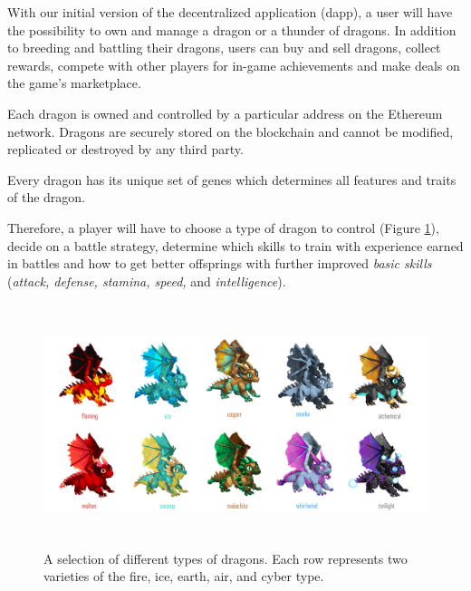 \documentclass[12pt]{article}
\begin{document}
With our initial version of the decentralized application (dapp), a user will have the possibility to own and manage a dragon or a thunder of dragons. In addition to breeding and battling their dragons, users can buy and sell dragons, collect rewards, compete with other players for in-game achievements and make deals on the game’s marketplace.\par

Each dragon is owned and controlled by a particular address on the Ethereum network. Dragons are securely stored on the blockchain and cannot be modified, replicated or destroyed by any third party.\par

Every dragon has its unique set of genes which determines all features and traits of the dragon.\par

Therefore, a player will have to choose a type of dragon to control (Figure \ref{fig:A_selection_of_different_types_of_dragons__Each_row_represents_two_varieties_of_the_fire_ice_earth_air_and_cyber_type_}), decide on a battle strategy, determine which skills to train with experience earned in battles and how to get better offsprings with further improved \textit{basic skills} (\textit{attack, defense, stamina, speed, }and\textit{ intelligence}). \par




\begin{Center}
\begin{figure}[!ht]
	\begin{Center}		\includegraphics[width=6.27in,height=2.79in]{./media/image13.png}
		\caption{A selection of different types of dragons.  Each row represents two varieties of the fire, ice, earth, air, and cyber type. }
		\label{fig:A_selection_of_different_types_of_dragons__Each_row_represents_two_varieties_of_the_fire_ice_earth_air_and_cyber_type_}
	\end{Center}\end{figure}
\end{Center}
\end{document}
